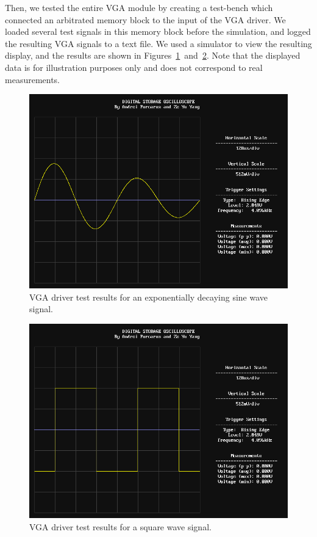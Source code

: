 \documentclass[journal]{IEEEtran}
\begin{document}
Then, we tested the entire VGA module by creating a test-bench which connected an arbitrated memory block to the input of the VGA driver. We loaded several test signals in this memory block before the simulation, and logged the resulting VGA signals to a text file. We used a simulator to view the resulting display, and the results are shown in Figures~\ref{fig:vga_test_1}~and~\ref{fig:vga_test_2}. Note that the displayed data is for illustration purposes only and does not correspond to real measurements.

\begin{figure}[!htb]
  \centering
  \includegraphics[width=\columnwidth]{test-results/vga_test_signal1.png}
  \caption{VGA driver test results for an exponentially decaying sine wave signal.}
  \label{fig:vga_test_1}
\end{figure}

\begin{figure}[!htb]
  \centering
  \includegraphics[width=\columnwidth]{test-results/vga_test_signal2.png}
  \caption{VGA driver test results for a square wave signal.}
  \label{fig:vga_test_2}
\end{figure}
\end{document}
